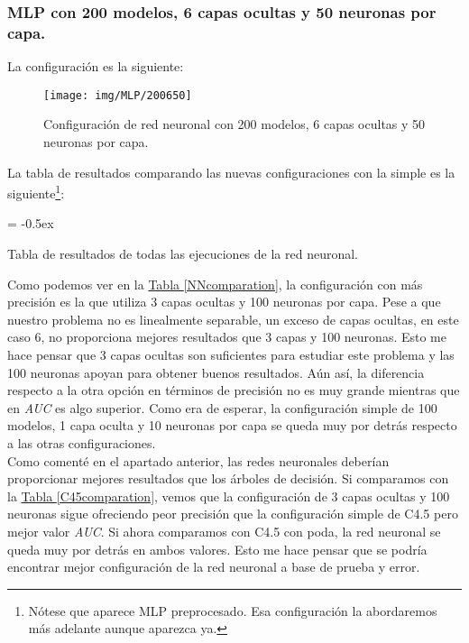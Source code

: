 \documentclass[paper=a4, fontsize=12pt]{article} %
\numberwithin{equation}{section} %
\numberwithin{figure}{section} %
\numberwithin{table}{section} %
\begin{document}
 \subsubsection {MLP con 200 modelos, 6 capas ocultas y 50 neuronas por capa.}
La configuración es la siguiente:

	\begin{figure}[H]
	  \centering
	  \texttt{[image: img/MLP/200650]}
	  \caption{Configuración de red neuronal con 200 modelos, 6 capas ocultas y 50 neuronas por capa.}
	  \label{NN2006}
	\end{figure}

La tabla de resultados comparando las nuevas configuraciones con la simple es la siguiente\footnote{Nótese que aparece MLP preprocesado. Esa configuración la abordaremos más adelante aunque aparezca ya.}:

	\extrarowheight = -0.5ex %
	\renewcommand{\arraystretch}{1.75} %
	\begin{table}[H]
		\begin{center}
		\end{center}
		\caption {Tabla de resultados de todas las ejecuciones de la red neuronal.}
		\label {NNcomparation}
	\end{table}

Como podemos ver en la \hyperref[NNcomparation]{Tabla \ref*{NNcomparation}}, la configuración con más precisión es la que utiliza 3 capas ocultas y 100 neuronas por capa. Pese a que nuestro problema no es linealmente separable, un exceso de capas ocultas, en este caso 6, no proporciona mejores resultados que 3 capas y 100 neuronas. Esto me hace pensar que 3 capas ocultas son suficientes para estudiar este problema y las 100 neuronas apoyan para obtener buenos resultados. Aún así, la diferencia respecto a la otra opción en términos de precisión no es muy grande mientras que en \textit{AUC} es algo superior. Como era de esperar, la configuración simple de 100 modelos, 1 capa oculta y 10 neuronas por capa se queda muy por detrás respecto a las otras configuraciones. \\

Como comenté en el apartado anterior, las redes neuronales deberían proporcionar mejores resultados que los árboles de decisión. Si comparamos con la \hyperref[C45comparation]{Tabla \ref*{C45comparation}}, vemos que la configuración de 3 capas ocultas y 100 neuronas sigue ofreciendo peor precisión que la configuración simple de C4.5 pero mejor valor \textit{AUC}. Si ahora comparamos con C4.5 con poda, la red neuronal se queda muy por detrás en ambos valores. Esto me hace pensar que se podría encontrar mejor configuración de la red neuronal a base de prueba y error. \\
\end{document}
